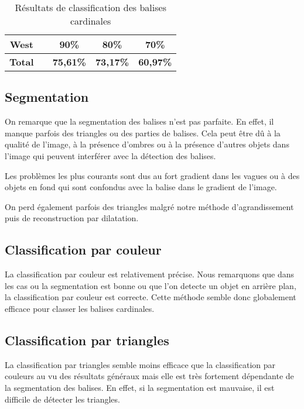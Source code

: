 \documentclass{article}
\begin{document}
\begin{table}[h!]
{\begin{tabular}{|c|p{4cm}|c|c|c|}
            \rowcolor{gray!40}
            \textbf{West}        &                              & 90\%                          & 80\%                             & 70\%                 \\ \hline
            \rowcolor{gray!40}
            \textbf{Total}       &                              & \textbf{75,61\%}              & \textbf{73,17\%}                 & \textbf{60,97\%}     \\ \hline
        \end{tabular}%
    }
    \caption{Résultats de classification des balises cardinales}\label{tab:segmentation_results}
\end{table}

\subsection{Segmentation}

On remarque que la segmentation des balises n'est pas parfaite. En effet, il
manque parfois des triangles ou des parties de balises. Cela peut être dû à la
qualité de l'image, à la présence d'ombres ou à la présence d'autres objets
dans l'image qui peuvent interférer avec la détection des balises.

Les problèmes les plus courants sont dus au fort gradient dans les vagues ou à
des objets en fond qui sont confondus avec la balise dans le gradient de
l'image.

On perd également parfois des triangles malgré notre méthode d'agrandissement
puis de reconstruction par dilatation.

\subsection{Classification par couleur}

La classification par couleur est relativement précise. Nous remarquons que
dans les cas ou la segmentation est bonne ou que l'on detecte un objet en
arrière plan, la classification par couleur est correcte. Cette méthode semble
donc globalement efficace pour classer les balises cardinales.

\subsection{Classification par triangles}

La classification par triangles semble moins efficace que la classification par
couleurs au vu des résultats généraux mais elle est très fortement dépendante
de la segmentation des balises. En effet, si la segmentation est mauvaise, il
est difficile de détecter les triangles.
\end{document}
